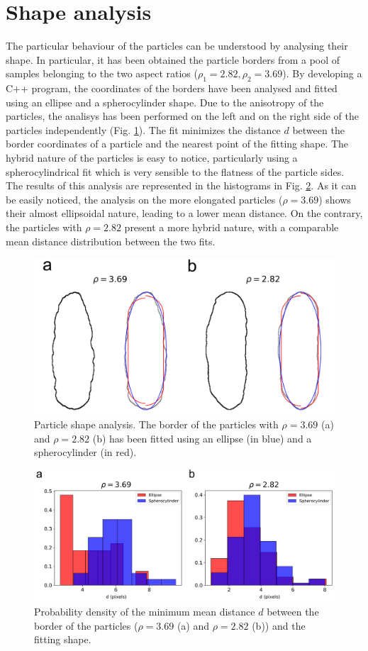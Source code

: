\documentclass[aip,graphicx]{revtex4-1}
\begin{document}
\section{Shape analysis}

The particular behaviour of the particles can be understood by analysing their shape. In particular, it has been obtained the particle borders from a pool of samples belonging to the two aspect ratios ($\rho_1 = 2.82, \rho_2 = 3.69$). By developing a C++ program, the coordinates of the borders have been analysed and fitted using an ellipse and a spherocylinder shape. Due to the anisotropy of the particles, the analisys has been performed on the left and on the right side of the particles independently (Fig. \ref{fig:Part_fit}). The fit minimizes the distance $d$ between the border coordinates of a particle and the nearest point of the fitting shape. The hybrid nature of the particles is easy to notice, particularly using a spherocylindrical fit which is very sensible to the flatness of the particle sides. The results of this analysis are represented in the histograms in Fig. \ref{fig:Mean_dist}. As it can be easily noticed, the analysis on the more elongated particles ($\rho = 3.69$) shows their almost ellipsoidal nature, leading to a lower mean distance. On the contrary, the particles with $\rho = 2.82$ present a more hybrid nature, with a comparable mean distance distribution between the two fits.

\begin{figure}
    \centering
    \includegraphics[width=0.7\columnwidth]{Part fit.png}
    \caption{Particle shape analysis. The border of the particles with $\rho = 3.69$ (a) and $\rho = 2.82$ (b) has been fitted using an ellipse (in blue) and a spherocylinder (in red).}
    \label{fig:Part_fit}
\end{figure}


\begin{figure}
    \centering
    \includegraphics[width=0.7\columnwidth]{Mean_dist.png}
    \caption{Probability density of the minimum mean distance $d$ between the border of the particles ($\rho = 3.69$ (a) and $\rho = 2.82$ (b)) and the fitting shape.}
    \label{fig:Mean_dist}
\end{figure}
\end{document}
